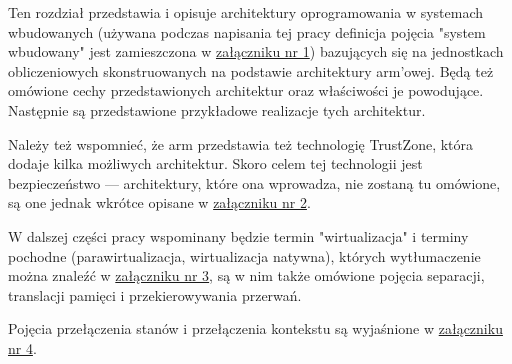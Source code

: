 \documentclass[../../main]{subfiles}
\begin{document}

Ten rozdział przedstawia i opisuje architektury oprogramowania w systemach wbudowanych (używana podczas
napisania tej pracy definicja pojęcia "system wbudowany" jest zamieszczona w
\hyperref[sec:zalacznik-1]{załączniku nr 1}) bazujących się na jednostkach obliczeniowych
skonstruowanych na podstawie architektury \acrshort{arm}'owej. Będą też omówione cechy
przedstawionych architektur oraz właściwości je powodujące. Następnie są przedstawione przykładowe
realizacje tych architektur.

Należy też wspomnieć, że \acrshort{arm} przedstawia też technologię TrustZone, która dodaje kilka
możliwych architektur. Skoro celem tej technologii jest bezpieczeństwo — architektury, które ona
wprowadza, nie zostaną tu omówione, są one jednak wkrótce opisane w \hyperref[sec:zalacznik-2]
{załączniku nr 2}.

W dalszej części pracy wspominany będzie termin "wirtualizacja" i terminy pochodne (parawirtualizacja,
wirtualizacja natywna), których wytłumaczenie można znaleźć w \hyperref[sec:zalacznik-3]{załączniku
nr 3}, są w nim także omówione pojęcia separacji, translacji pamięci i przekierowywania przerwań.

Pojęcia przełączenia stanów i przełączenia kontekstu są wyjaśnione w
\hyperref[sec:zalacznik-4]{załączniku nr 4}.
\end{document}
